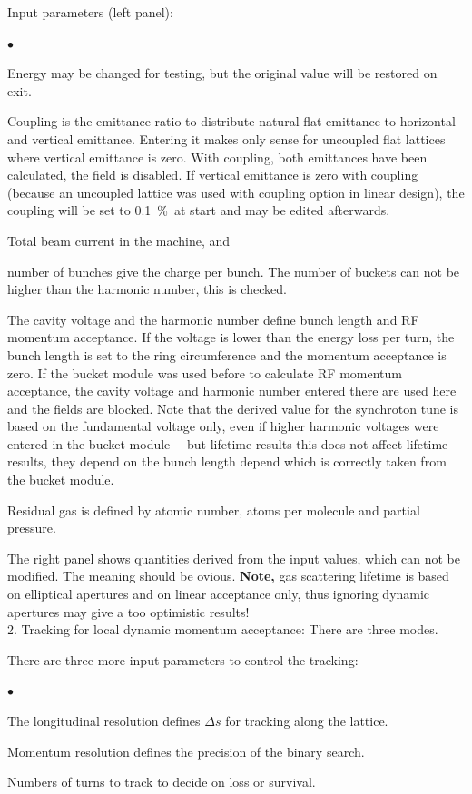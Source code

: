 \documentclass[12pt]{article}
\newenvironment{mylist}
  {\begin{list}{$\bullet$}{\parsep 0pt}}
  {\end{list}}
\begin{document}
Input parameters (left panel):
\begin{mylist}
\item Energy may be changed for testing, but the original value will be restored on exit.
\item Coupling is the emittance ratio to distribute natural flat emittance to horizontal and vertical emittance. Entering it makes only sense for uncoupled flat lattices where vertical emittance is zero. With coupling, both emittances have been calculated, the field is disabled. If vertical emittance is zero with coupling (because an uncoupled lattice was used with coupling option in linear design), the coupling will be set to 0.1~\%\ at start and may be edited afterwards.
\item Total beam current in the machine, and
\item number of bunches give the charge per bunch. The number of buckets can not
be higher than the harmonic number, this is checked.
\item The cavity voltage and the harmonic number define bunch length and RF momentum acceptance. If the voltage is lower than the energy loss per turn, the bunch length is set to the ring circumference and the momentum acceptance is zero. If the bucket module was used before to calculate RF momentum acceptance, the cavity voltage and harmonic number entered there are used here and the fields are blocked. Note that the derived value for the  synchroton tune is based on the fundamental voltage only, even if higher harmonic voltages were entered in the bucket module~-- but lifetime results this does not affect lifetime results, they depend on the bunch length depend which is correctly taken from the bucket module.
\item Residual gas is defined by atomic number, atoms per molecule and partial pressure.
\end{mylist}

The right panel shows quantities derived from the input values, which can not be modified. The meaning should be ovious. {\bf Note,} gas scattering lifetime is based on elliptical apertures and on linear acceptance only, thus ignoring dynamic apertures may give a too optimistic results! \\ 

2. Tracking for local dynamic momentum acceptance: There are three modes.

There are three more input parameters to control the tracking:
\begin{mylist}
\item The longitudinal resolution defines $\Delta s$ for tracking along the lattice.
\item Momentum resolution defines the precision of the binary search.
\item Numbers of turns to track to decide on loss or survival.
\end{mylist}
\end{document}
